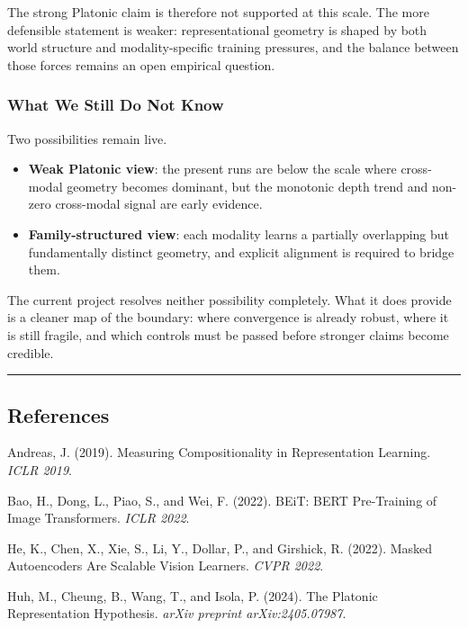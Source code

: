 \documentclass[
]{article}
\providecommand{\tightlist}{%
  \setlength{\itemsep}{0pt}\setlength{\parskip}{0pt}}
\begin{document}
The strong Platonic claim is therefore not supported at this scale. The
more defensible statement is weaker: representational geometry is shaped
by both world structure and modality-specific training pressures, and
the balance between those forces remains an open empirical question.

\subsubsection{What We Still Do Not
Know}\label{what-we-still-do-not-know}

Two possibilities remain live.

\begin{itemize}
\tightlist
\item
  \textbf{Weak Platonic view}: the present runs are below the scale
  where cross-modal geometry becomes dominant, but the monotonic depth
  trend and non-zero cross-modal signal are early evidence.
\item
  \textbf{Family-structured view}: each modality learns a partially
  overlapping but fundamentally distinct geometry, and explicit
  alignment is required to bridge them.
\end{itemize}

The current project resolves neither possibility completely. What it
does provide is a cleaner map of the boundary: where convergence is
already robust, where it is still fragile, and which controls must be
passed before stronger claims become credible.

\begin{center}\rule{0.5\linewidth}{0.5pt}\end{center}

\subsection{References}\label{references}

Andreas, J. (2019). Measuring Compositionality in Representation
Learning. \emph{ICLR 2019}.

Bao, H., Dong, L., Piao, S., and Wei, F. (2022). BEiT: BERT Pre-Training
of Image Transformers. \emph{ICLR 2022}.

He, K., Chen, X., Xie, S., Li, Y., Dollar, P., and Girshick, R. (2022).
Masked Autoencoders Are Scalable Vision Learners. \emph{CVPR 2022}.

Huh, M., Cheung, B., Wang, T., and Isola, P. (2024). The Platonic
Representation Hypothesis. \emph{arXiv preprint arXiv:2405.07987}.
\end{document}
